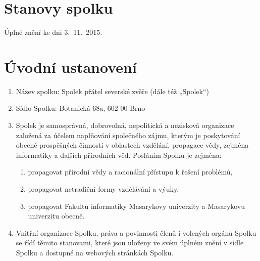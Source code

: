 \documentclass[11pt,a4paper]{article}
\begin{document}
\section*{\Huge{}Stanovy spolku}

Úplné znění ke dni 3.\ 11.\ 2015.

\section{Úvodní ustanovení}
\begin{enumerate}[itemsep=0pt]
    \item Název spolku: Spolek přátel severské zvěře (dále též „Spolek“)
    \item Sídlo Spolku: Botanická 68a, 602 00 Brno
    \item Spolek je samosprávná, dobrovolná, nepolitická a nezisková organizace 
    založená za účelem naplňování společného zájmu, kterým je poskytování obecně
    prospěšných činností v oblastech vzdělání, propagace vědy, zejména 
    informatiky a dalších přírodních věd. Posláním Spolku je zejména: 
    \begin{enumerate}[itemsep=0pt,topsep=0pt]
        \item propagovat přírodní vědy a racionální přístupu k řešení problémů,
        \item propagovat netradiční formy vzdělávání a výuky,
        \item propagovat Fakultu informatiky Masarykovy univerzity a Masarykovu univerzitu obecně.
    \end{enumerate}
    \item Vnitřní organizace Spolku, práva a povinnosti členů i volených orgánů 
    Spolku se řídí těmito stanovami, které jsou uloženy ve svém úplném znění 
    v sídle Spolku a dostupné na webových stránkách Spolku.
\end{enumerate}
\end{document}
